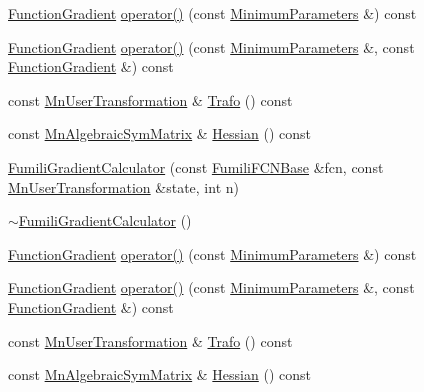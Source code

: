 \begin{DoxyCompactItemize}
\item 
\mbox{\hyperlink{classROOT_1_1Minuit2_1_1FunctionGradient}{Function\+Gradient}} \mbox{\hyperlink{classROOT_1_1Minuit2_1_1FumiliGradientCalculator_a23fd61bceabbf88e66c5abe6b2815331}{operator()}} (const \mbox{\hyperlink{classROOT_1_1Minuit2_1_1MinimumParameters}{Minimum\+Parameters}} \&) const
\item 
\mbox{\hyperlink{classROOT_1_1Minuit2_1_1FunctionGradient}{Function\+Gradient}} \mbox{\hyperlink{classROOT_1_1Minuit2_1_1FumiliGradientCalculator_a652f65091b404ebda9a645d7ba92b3b6}{operator()}} (const \mbox{\hyperlink{classROOT_1_1Minuit2_1_1MinimumParameters}{Minimum\+Parameters}} \&, const \mbox{\hyperlink{classROOT_1_1Minuit2_1_1FunctionGradient}{Function\+Gradient}} \&) const
\item 
const \mbox{\hyperlink{classROOT_1_1Minuit2_1_1MnUserTransformation}{Mn\+User\+Transformation}} \& \mbox{\hyperlink{classROOT_1_1Minuit2_1_1FumiliGradientCalculator_a60672fa936f927ab01a7eb9ede6cb6e0}{Trafo}} () const
\item 
const \mbox{\hyperlink{namespaceROOT_1_1Minuit2_a9e74ad97f5537a2e80e52b04d98ecc6e}{Mn\+Algebraic\+Sym\+Matrix}} \& \mbox{\hyperlink{classROOT_1_1Minuit2_1_1FumiliGradientCalculator_aa6c751b836a8ce27b7335d7d3d6a653f}{Hessian}} () const
\item 
\mbox{\hyperlink{classROOT_1_1Minuit2_1_1FumiliGradientCalculator_a16d3be3cdef72a0d3cee0bbc683757fc}{Fumili\+Gradient\+Calculator}} (const \mbox{\hyperlink{classROOT_1_1Minuit2_1_1FumiliFCNBase}{Fumili\+F\+C\+N\+Base}} \&fcn, const \mbox{\hyperlink{classROOT_1_1Minuit2_1_1MnUserTransformation}{Mn\+User\+Transformation}} \&state, int n)
\item 
\mbox{\hyperlink{classROOT_1_1Minuit2_1_1FumiliGradientCalculator_ad976f280f136a5bffb2a317da3f94136}{$\sim$\+Fumili\+Gradient\+Calculator}} ()
\item 
\mbox{\hyperlink{classROOT_1_1Minuit2_1_1FunctionGradient}{Function\+Gradient}} \mbox{\hyperlink{classROOT_1_1Minuit2_1_1FumiliGradientCalculator_a23fd61bceabbf88e66c5abe6b2815331}{operator()}} (const \mbox{\hyperlink{classROOT_1_1Minuit2_1_1MinimumParameters}{Minimum\+Parameters}} \&) const
\item 
\mbox{\hyperlink{classROOT_1_1Minuit2_1_1FunctionGradient}{Function\+Gradient}} \mbox{\hyperlink{classROOT_1_1Minuit2_1_1FumiliGradientCalculator_a652f65091b404ebda9a645d7ba92b3b6}{operator()}} (const \mbox{\hyperlink{classROOT_1_1Minuit2_1_1MinimumParameters}{Minimum\+Parameters}} \&, const \mbox{\hyperlink{classROOT_1_1Minuit2_1_1FunctionGradient}{Function\+Gradient}} \&) const
\item 
const \mbox{\hyperlink{classROOT_1_1Minuit2_1_1MnUserTransformation}{Mn\+User\+Transformation}} \& \mbox{\hyperlink{classROOT_1_1Minuit2_1_1FumiliGradientCalculator_a60672fa936f927ab01a7eb9ede6cb6e0}{Trafo}} () const
\item 
const \mbox{\hyperlink{namespaceROOT_1_1Minuit2_a9e74ad97f5537a2e80e52b04d98ecc6e}{Mn\+Algebraic\+Sym\+Matrix}} \& \mbox{\hyperlink{classROOT_1_1Minuit2_1_1FumiliGradientCalculator_aa6c751b836a8ce27b7335d7d3d6a653f}{Hessian}} () const
\end{DoxyCompactItemize}


